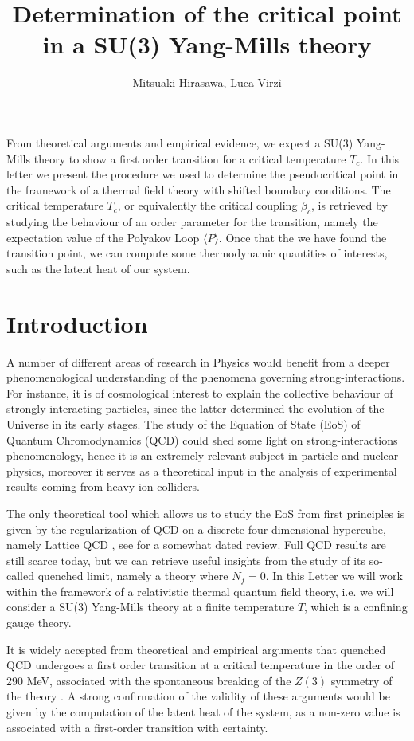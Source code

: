\documentclass{article}
\title{Determination of the critical point in a SU(3) Yang-Mills theory}
\author{Mitsuaki Hirasawa, Luca Virzì}
\begin{document}
\maketitle

From theoretical arguments and empirical evidence, we expect a SU(3) Yang-Mills theory to show a first order transition for a critical temperature $T_c$. In this letter we present the procedure we used to determine the pseudocritical point in the framework of a thermal field theory with shifted boundary conditions. The critical temperature $T_c$, or equivalently the critical coupling $\beta_c$, is retrieved by studying the behaviour of an order parameter for the transition, namely the expectation value of the Polyakov Loop $\langle P \rangle$. Once that the we have found the transition point, we can compute some thermodynamic quantities of interests, such as the latent heat of our system.

\section{Introduction}
A number of different areas of research in Physics would benefit from a deeper phenomenological understanding of the phenomena governing strong-interactions. For instance, it is of cosmological interest to explain the collective behaviour of strongly interacting particles, since the latter determined the evolution of the Universe in its early stages. The study of the Equation of State (EoS) of Quantum Chromodynamics (QCD) could shed some light on strong-interactions phenomenology, hence it is an extremely relevant subject in particle and nuclear physics, moreover it serves as a theoretical input in the analysis of experimental results coming from heavy-ion colliders. %

The only theoretical tool which allows us to study the EoS from first principles is given by the regularization of QCD on a discrete four-dimensional hypercube, namely Lattice QCD \cite{Boyd_1996, Bors_nyi_2014, Umeda_2009}, see \cite{Philipsen_2013} for a somewhat dated review. Full QCD results are still scarce today, but we can retrieve useful insights from the study of its so-called quenched limit, namely a theory where $N_f = 0$. 
In this Letter we will work within the framework of a relativistic thermal quantum field theory, i.e. we will consider a SU(3) Yang-Mills theory at a finite temperature $T$, which is a confining gauge theory.

It is widely accepted from theoretical and empirical arguments that quenched QCD undergoes a first order transition at a critical temperature in the order of 290 MeV, associated with the spontaneous breaking of the $Z(3)$ symmetry of the theory \cite{Borsanyi:2022xml}. %
A strong confirmation of the validity of these arguments would be given by the computation of the latent heat of the system, as a non-zero value is associated with a first-order transition with certainty. %
\end{document}
